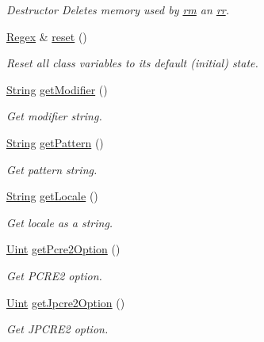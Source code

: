 \begin{DoxyCompactItemize}
\begin{DoxyCompactList}\small\item\em Destructor Deletes memory used by \hyperlink{classjpcre2_1_1Regex_a447925705d222dbbd8c7d60b98cc65f0}{rm} an \hyperlink{classjpcre2_1_1Regex_a5a7ac6c6288988079b8933b4b6637fab}{rr}. \end{DoxyCompactList}\item 
\hyperlink{classjpcre2_1_1Regex}{Regex} \& \hyperlink{classjpcre2_1_1Regex_a91f6afe257e9633cbb79a98649ab8d02}{reset} ()
\begin{DoxyCompactList}\small\item\em Reset all class variables to its default (initial) state. \end{DoxyCompactList}\item 
\hyperlink{namespacejpcre2_a91f03070152fb228bc116c5a737f1d16}{String} \hyperlink{classjpcre2_1_1Regex_a0ac4e063f00128b96cd94c33609dc559}{get\+Modifier} ()
\begin{DoxyCompactList}\small\item\em Get modifier string. \end{DoxyCompactList}\item 
\hyperlink{namespacejpcre2_a91f03070152fb228bc116c5a737f1d16}{String} \hyperlink{classjpcre2_1_1Regex_a006dd17f71a2d717aa9575d72fac6d7b}{get\+Pattern} ()
\begin{DoxyCompactList}\small\item\em Get pattern string. \end{DoxyCompactList}\item 
\hyperlink{namespacejpcre2_a91f03070152fb228bc116c5a737f1d16}{String} \hyperlink{classjpcre2_1_1Regex_ae9afaf627ed922a9e4cee8074d30edfa}{get\+Locale} ()
\begin{DoxyCompactList}\small\item\em Get locale as a string. \end{DoxyCompactList}\item 
\hyperlink{namespacejpcre2_a078242d38221a13fb3543b9edd78c099}{Uint} \hyperlink{classjpcre2_1_1Regex_a857307fc59ba7f010b097e61c1744923}{get\+Pcre2\+Option} ()
\begin{DoxyCompactList}\small\item\em Get P\+C\+R\+E2 option. \end{DoxyCompactList}\item 
\hyperlink{namespacejpcre2_a078242d38221a13fb3543b9edd78c099}{Uint} \hyperlink{classjpcre2_1_1Regex_a5d2d04eb7c393338a4c8cce941e957ef}{get\+Jpcre2\+Option} ()
\begin{DoxyCompactList}\small\item\em Get J\+P\+C\+R\+E2 option. \end{DoxyCompactList}\item 

\end{DoxyCompactItemize}
